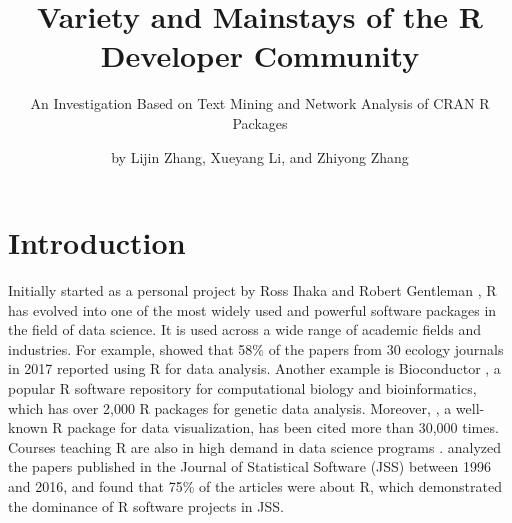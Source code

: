 


\title{Variety and Mainstays of the R Developer Community}
\subtitle{An Investigation Based on Text Mining and Network Analysis of CRAN R Packages}
\author{by Lijin Zhang, Xueyang Li, and Zhiyong Zhang}
\maketitle




\section{Introduction}

Initially started as a personal project by Ross Ihaka and Robert Gentleman \citep{ihaka1996r}, R has evolved into one of the most widely used and powerful software packages in the field of data science. It is used across a wide range of academic fields and industries.  For example, \citet{lai2019evaluating} showed that 58\% of the papers from 30 ecology journals in 2017 reported using R for data analysis. Another example is Bioconductor \citep{gentleman2004bioconductor}, a popular R software repository for computational biology and bioinformatics, which has over 2,000 R packages for genetic data analysis. Moreover,  \citep{wickham2011ggplot2}, a well-known R package for data visualization, has been cited more than 30,000 times. Courses teaching R are also in high demand in data science programs \citep{zhang2021data}. \citet{fox2016r} analyzed the papers published in the Journal of Statistical Software (JSS) between 1996 and 2016, and found that 75\% of the articles were about R, which demonstrated the dominance of R software projects in JSS. 

